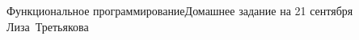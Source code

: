 


\BigHeader
	{Функциональное программирование}{Домашнее задание на 21 сентября}
	{Лиза~Третьякова}




